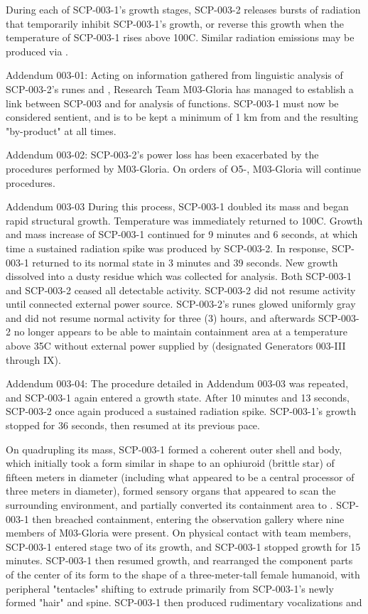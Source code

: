 During each of SCP-003-1's growth stages, SCP-003-2 releases bursts of radiation that temporarily inhibit SCP-003-1's growth, or reverse this growth when the temperature of SCP-003-1 rises above 100\degree C. Similar radiation emissions may be produced via \expunged.

Addendum 003-01: Acting on information gathered from linguistic analysis of SCP-003-2's runes and \expunged, Research Team M03-Gloria has managed to establish a link between SCP-003 and \expunged for analysis of functions. SCP-003-1 must now be considered sentient, and is to be kept a minimum of 1 km from \expunged and the resulting "by-product" at all times.

Addendum 003-02: SCP-003-2's power loss has been exacerbated by the procedures performed by M03-Gloria. On orders of O5-, M03-Gloria will continue procedures.

Addendum 003-03 \expunged During this process, SCP-003-1 doubled its mass and began rapid structural growth. Temperature was immediately returned to 100\degree C. Growth and mass increase of SCP-003-1 continued for 9 minutes and 6 seconds, at which time a sustained radiation spike was produced by SCP-003-2. In response, SCP-003-1 returned to its normal state in 3 minutes and 39 seconds. New growth dissolved into a dusty residue which was collected for analysis. Both SCP-003-1 and SCP-003-2 ceased all detectable activity. SCP-003-2 did not resume activity until connected \redacted external power source. SCP-003-2's runes glowed uniformly gray and did not resume normal activity for three (3) hours, and afterwards \expunged SCP-003-2 no longer appears to be able to maintain containment area at a temperature above 35\degree C without external power supplied by \redacted (designated Generators 003-III through IX).

Addendum 003-04: The procedure detailed in Addendum 003-03 was repeated, and SCP-003-1 again entered a growth state. After 10 minutes and 13 seconds, SCP-003-2 once again produced a sustained radiation spike. SCP-003-1's growth stopped for 36 seconds, then resumed at its previous pace.

On quadrupling its mass, SCP-003-1 formed a coherent outer shell and body, which initially took a form similar in shape to an ophiuroid (brittle star) of fifteen meters in diameter (including what appeared to be a central processor of three meters in diameter), formed sensory organs that appeared to scan the surrounding environment, and partially converted its containment area to \redacted. SCP-003-1 then breached containment, entering the observation gallery where nine members of M03-Gloria were present. On physical contact with team members, SCP-003-1 entered stage two of its growth, and \expunged SCP-003-1 stopped growth for 15 minutes. SCP-003-1 then resumed growth, and rearranged the component parts of the center of its form to the shape of a three-meter-tall female humanoid, with peripheral "tentacles" shifting to extrude primarily from SCP-003-1's newly formed "hair" and spine. SCP-003-1 then produced rudimentary vocalizations and \expunged

